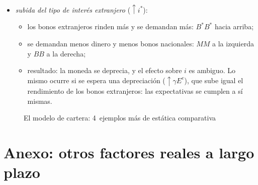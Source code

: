 \documentclass[11pt]{article}
\begin{document}
\begin{itemize}
\begin{itemize}
\begin{itemize}
    \item aumenta la riqueza: $MM$ a la derecha y $BB$ a la izquierda;
    \item hay más bonos extranjeros que colocar: $B^*B^*$ hacia abajo;
    \item resultado: la moneda se aprecia, y el efecto sobre $i$ es ambiguo. Es el mecanismo por el que, tras una depreciación, la acumulación de activos exteriores devuelve poco a poco el tipo de cambio;
    \end{itemize}
  \item \emph{subida del tipo de interés extranjero} ($\uparrow i^*$):
    \begin{itemize}
    \item los bonos extranjeros rinden más y se demandan más: $B^*B^*$ hacia arriba;
    \item se demandan menos dinero y menos bonos nacionales: $MM$ a la izquierda y $BB$ a la derecha;
    \item resultado: la moneda se deprecia, y el efecto sobre $i$ es ambiguo. Lo mismo ocurre si se espera una depreciación ($\uparrow\gamma E^e$), que sube igual el rendimiento de los bonos extranjeros: las expectativas se cumplen a sí mismas.
    \end{itemize}
  \end{itemize}
\end{itemize}

\begin{figure}[H]
\centering
\caption{El modelo de cartera: 4~ejemplos más de estática comparativa}\label{fig:branson-ejemplos}
\end{figure}

\section{Anexo: otros factores reales a largo plazo}\label{anexo:mishkin}
\end{document}
